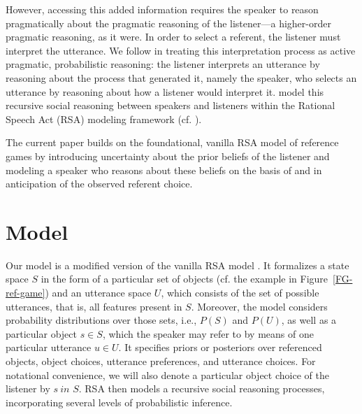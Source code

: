 \documentclass[10pt,a4paper]{article}
\newcommand{\sem}[1]{\mbox{$[\![$#1$]\!]$}}
\newcommand{\gcs}[1]{\textcolor{blue}{[gcs: #1]}}
\begin{document}
However, accessing this added information requires the speaker to reason pragmatically about the pragmatic reasoning of the listener---a higher-order pragmatic reasoning, as it were.
In order to select a referent, the listener must interpret the utterance. We follow  in treating this interpretation process as active pragmatic, probabilistic reasoning: the listener interprets an utterance by reasoning about the process that generated it, namely the speaker, who selects an utterance by reasoning about how a listener would interpret it. \citeauthor{frankgoodman2012} model this recursive social reasoning between speakers and listeners within the Rational Speech Act (RSA) modeling framework (cf. ).

The current paper builds on the foundational, vanilla RSA model of reference games by introducing uncertainty about the prior beliefs of the listener and modeling a speaker who reasons about these beliefs on the basis of and in anticipation of the observed referent choice. 



\section{Model}
Our model is a modified version of the vanilla RSA model \cite{frankgoodman2012}. 
It formalizes a state space $S$ in the form of a particular set of objects (cf. the example in Figure~\ref{FG-ref-game}) and an utterance space $U$, which consists of the set of possible utterances, that is, all features present in $S$. 
Moreover, the model considers probability distributions over those sets, i.e., $P(S)$ and $P(U)$, as well as 
a particular object $s\in S$, which the speaker may refer to by means of one particular utterance $u \in U$.
It specifies priors or posteriors over referenced objects, object choices, utterance preferences, and utterance choices. 
For notational convenience, we will also denote a particular object choice of the listener by $s \ in$ $S$.
RSA then models a recursive social reasoning processes, incorporating several levels of probabilistic inference. 
\end{document}
